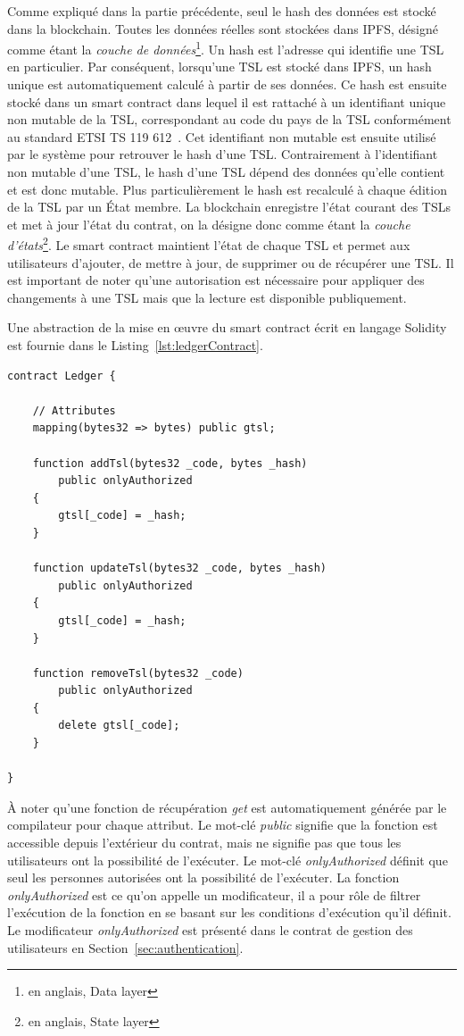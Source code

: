\documentclass{tnreport}
\begin{document}
Comme expliqué dans la partie précédente, seul le hash des données est stocké dans la blockchain.
Toutes les données réelles sont stockées dans IPFS, désigné comme étant la {\em couche de données}\footnote{en anglais, Data layer}. 
Un hash est l'adresse qui identifie une TSL en particulier. 
Par conséquent, lorsqu'une TSL est stocké dans IPFS, un hash unique est automatiquement calculé à partir de ses données. 
Ce hash est ensuite stocké dans un smart contract dans lequel il est rattaché à un identifiant unique non mutable de la TSL, correspondant au code du pays de la TSL conformément au standard ETSI TS 119 612~\cite{ETSITS119612}.
Cet identifiant non mutable est ensuite utilisé par le système pour retrouver le hash d'une TSL.
Contrairement à l'identifiant non mutable d'une TSL, le hash d'une TSL dépend des données qu'elle contient et est donc mutable. 
Plus particulièrement le hash est recalculé à chaque édition de la TSL par un État membre.
La blockchain enregistre l'état courant des TSLs et met à jour l'état du contrat, on la désigne donc comme étant la {\em couche d'états}\footnote{en anglais, State layer}. 
Le smart contract maintient l'état de chaque TSL et permet aux utilisateurs d'ajouter, de mettre à jour, de supprimer ou de récupérer une TSL.
Il est important de noter qu'une autorisation est nécessaire pour appliquer des changements à une TSL mais que la lecture est disponible publiquement.

Une abstraction de la mise en œuvre du smart contract écrit en langage Solidity est fournie dans le Listing~\ref{lst:ledgerContract}.

\clearpage
\begin{lstlisting}[language=solidity, basicstyle=\small, caption={Ledger Contract}, label={lst:ledgerContract}]
contract Ledger {
	
	// Attributes
	mapping(bytes32 => bytes) public gtsl;
	
	function addTsl(bytes32 _code, bytes _hash)
		public onlyAuthorized
	{
		gtsl[_code] = _hash;
	}
	
	function updateTsl(bytes32 _code, bytes _hash)
		public onlyAuthorized
	{
		gtsl[_code] = _hash;
	}
	
	function removeTsl(bytes32 _code)
		public onlyAuthorized
	{
		delete gtsl[_code];
	}
	
}
\end{lstlisting}

À noter qu'une fonction de récupération {\em get} est automatiquement générée par le compilateur pour chaque attribut. Le mot-clé {\em public} signifie que la fonction est accessible depuis l'extérieur du contrat, mais ne signifie pas que tous les utilisateurs ont la possibilité de l'exécuter. Le mot-clé {\em onlyAuthorized} définit que seul les personnes autorisées ont la possibilité de l'exécuter. La fonction {\em onlyAuthorized} est ce qu'on appelle un modificateur, il a pour rôle de filtrer l'exécution de la fonction en se basant sur les conditions d'exécution qu'il définit. Le modificateur {\em onlyAuthorized} est présenté dans le contrat de gestion des utilisateurs en Section~\ref{sec:authentication}.
\end{document}
